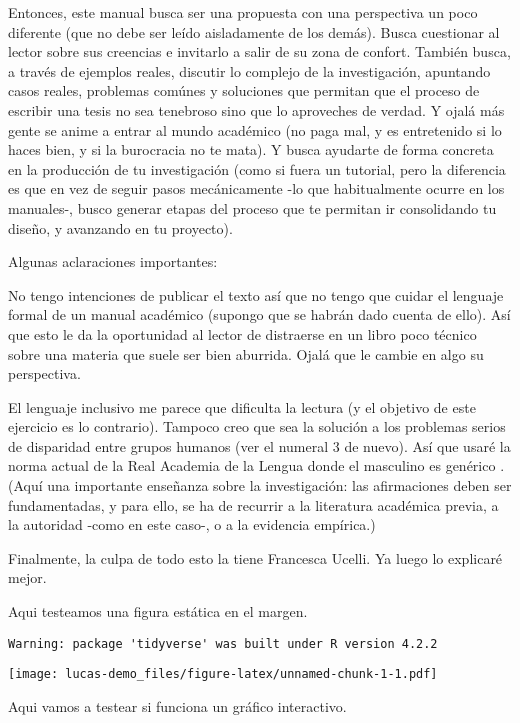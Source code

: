 \documentclass[
]{book}
\begin{document}
Entonces, este manual busca ser una propuesta con una perspectiva un poco diferente (que no debe ser leído aisladamente de los demás). Busca cuestionar al lector sobre sus creencias e invitarlo a salir de su zona de confort. También busca, a través de ejemplos reales, discutir lo complejo de la investigación, apuntando casos reales, problemas comúnes y soluciones que permitan que el proceso de escribir una tesis no sea tenebroso sino que lo aproveches de verdad. Y ojalá más gente se anime a entrar al mundo académico (no paga mal, y es entretenido si lo haces bien, y si la burocracia no te mata). Y busca ayudarte de forma concreta en la producción de tu investigación (como si fuera un tutorial, pero la diferencia es que en vez de seguir pasos mecánicamente -lo que habitualmente ocurre en los manuales-, busco generar etapas del proceso que te permitan ir consolidando tu diseño, y avanzando en tu proyecto).

Algunas aclaraciones importantes:

No tengo intenciones de publicar el texto así que no tengo que cuidar el lenguaje formal de un manual académico (supongo que se habrán dado cuenta de ello). Así que esto le da la oportunidad al lector de distraerse en un libro poco técnico sobre una materia que suele ser bien aburrida. Ojalá que le cambie en algo su perspectiva.

El lenguaje inclusivo me parece que dificulta la lectura (y el objetivo de este ejercicio es lo contrario). Tampoco creo que sea la solución a los problemas serios de disparidad entre grupos humanos (ver el numeral 3 de nuevo). Así que usaré la norma actual de la Real Academia de la Lengua donde el masculino es genérico \citep{rae}. (Aquí una importante enseñanza sobre la investigación: las afirmaciones deben ser fundamentadas, y para ello, se ha de recurrir a la literatura académica previa, a la autoridad -como en este caso-, o a la evidencia empírica.)

Finalmente, la culpa de todo esto la tiene Francesca Ucelli. Ya luego lo explicaré mejor.

Aqui testeamos una figura estática en el margen.

\begin{verbatim}
Warning: package 'tidyverse' was built under R version 4.2.2
\end{verbatim}

\texttt{[image: lucas-demo\_files/figure-latex/unnamed-chunk-1-1.pdf]}

Aqui vamos a testear si funciona un gráfico interactivo.
\end{document}

